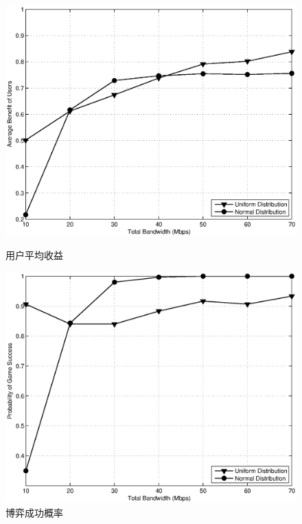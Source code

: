 \begin{figure}[!tb] 
    \centering
 \begin{minipage}[t]{0.65\linewidth} 
    \centering 
    \includegraphics[width = \textwidth]{bayesian_normal_bandwidth_vs_avg_benefit.eps} 
    \caption{用户平均收益} 
    \label{fig:chap_bayesian:normal_bandwidth_vs_avg_benefit} 
  \end{minipage}%

  \begin{minipage}[t]{0.65\linewidth} 
    \centering 
    \includegraphics[width=\textwidth]{bayesian_normal_bandwidth_vs_success_probability.eps} 
    \caption{博弈成功概率} 
    \label{fig:chap_bayesian:normal_bandwidth_vs_success_probability} 
  \end{minipage} 
\end{figure}

